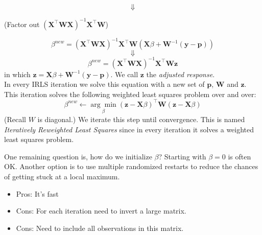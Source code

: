\documentclass[a4paper]{article}
\begin{document}
$$\Downarrow$$
\begin{center}(Factor out $(\mathbf{X}^\top \mathbf{W}\mathbf{X})^{-1}\mathbf{X}^\top \mathbf{W}$)\end{center}
$$\beta^{new} = (\mathbf{X}^\top \mathbf{W}\mathbf{X})^{-1}\mathbf{X}^\top \mathbf{W}(\mathbf{X}\beta+\mathbf{W}^{-1}(\mathbf{y}-\mathbf{p}))$$
$$\Downarrow$$
$$\beta^{new} = (\mathbf{X}^\top \mathbf{W}\mathbf{X})^{-1}\mathbf{X}^\top \mathbf{W}\mathbf{z}$$
in which $\mathbf{z}=\mathbf{X}\beta+\mathbf{W}^{-1}(\mathbf{y}-\mathbf{p})$. We call $\mathbf{z}$ the \textit{adjusted response}.\\
In every IRLS iteration we solve this equation with a new set of $\mathbf{p}$, $\mathbf{W}$ and $\mathbf{z}$. This iteration solves the following weighted least squares problem over and over:
$$\beta^{new}\leftarrow\underset{\beta}{\arg\min}(\mathbf{z}-\mathbf{X}\beta)^\top \mathbf{W}(\mathbf{z}-\mathbf{X}\beta)$$
(Recall $W$ is diagonal.)
We iterate this step until  convergence. 
This is named \emph{Iteratively Reweighted Least Squares} since in every iteration it solves a weighted least squares problem.

One remaining question is, how do we initialize $\beta$? Starting with $\beta=0$ is often OK.  Another option is to use multiple randomized restarts to reduce the chances of getting stuck at a local maximum.

\begin{itemize}
\item Pros: It's fast
\end{itemize}

\begin{itemize}
\item Cons: For each iteration need to invert a large matrix.
\item Cons: Need to include all observations in this matrix.
\end{itemize}
\end{document}
